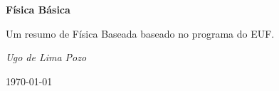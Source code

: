 \begin{titlepage}

    \centering
    \vspace{3.5cm}
    {\huge\bfseries Física Básica\par}
    \vspace{2cm}
    {\Large Um resumo de Física Baseada baseado no programa do EUF.\par}
    \vfill
    {\Large\itshape Ugo de Lima Pozo \par}

    \vfill
    {\large \today\par}

\end{titlepage}
